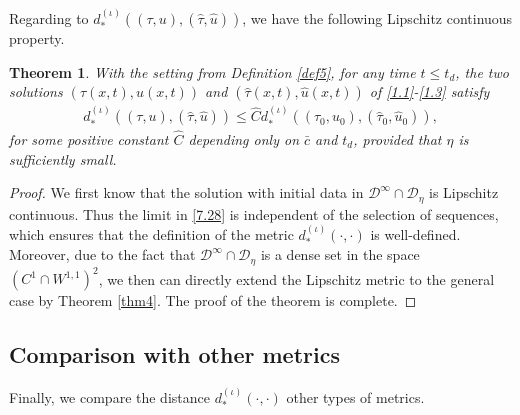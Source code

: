 \documentclass[11pt,reqno]{article}
\newtheorem{thm}{Theorem}
\numberwithin{equation}{section}
\begin{document}
Regarding to $d_{*}^{(\iota)}((\tau, u), (\hat{\tau}, \hat{u}))$, we have the following Lipschitz continuous property.
\begin{thm}\label{thm5}
With the setting from Definition \ref{def5}, for any time $t\leq t_d$,
the two solutions $(\tau(x,t), u(x,t))$ and $(\hat{\tau}(x,t), \hat{u}(x,t))$ of \eqref{1.1}-\eqref{1.3} satisfy
\begin{align}\label{7.30}
d_{*}^{(\iota)}((\tau, u),(\hat{\tau}, \hat{u}))\leq \widehat{C} d_{*}^{(\iota)}((\tau_0, u_{0}),(\hat{\tau}_0, \hat{u}_{0})),
\end{align}
for some positive constant $\widehat{C}$ depending only on $\bar{c}$ and $t_d$, provided that $\eta$ is sufficiently small.
\end{thm}
\begin{proof}
We first know that the solution with initial data in $\mathcal{D}^\infty\cap \mathcal{D}_\eta$ is Lipschitz continuous. Thus the limit in \eqref{7.28} is independent of the selection of sequences, which ensures that the definition of the metric $d_{*}^{(\iota)}(\cdot,\cdot)$ is well-defined.
Moreover, due to the fact that $\mathcal{D}^\infty\cap \mathcal{D}_\eta$ is a dense set in the space $(C^1\cap W^{1,1})^2$, we then can directly extend the Lipschitz metric to the general case by Theorem \ref{thm4}. The proof of the theorem is complete.
\end{proof}


\subsection{Comparison with other metrics}\label{S74}

Finally, we compare the distance $d_{*}^{(\iota)}(\cdot,\cdot)$ other types of metrics.
\end{document}

